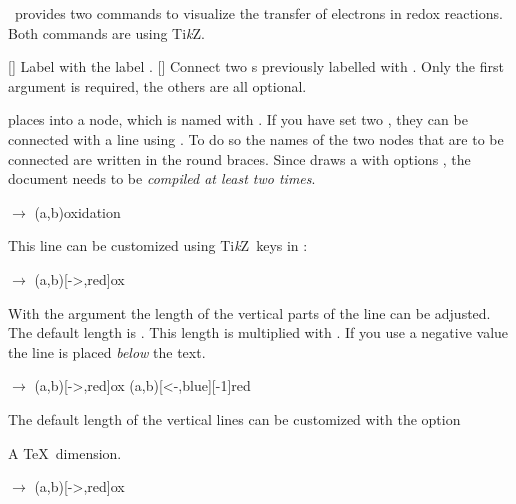 \documentclass[load-preamble+]{cnltx-doc}
\newcommand*\TikZ{Ti\textit{k}Z}
\begin{document}
\chemmacros\ provides two commands to visualize the transfer of electrons in
redox reactions.  Both commands are using \TikZ.
\begin{commands}
  []
    Label  with the label .
  []
    Connect two s previously labelled with .  Only the first
    argument  is required, the others are all
    optional.
\end{commands}

 places  into a node, which is named with .  If
you have set two , they can be connected with a line using .
To do so the names of the two nodes that are to be connected are written in
the round braces.  Since  draws a  with options
, the document needs to be \emph{compiled at
  least two times}.

\begin{example}
  \vspace{7mm}
   $\rightarrow$ \pch\redox(a,b){oxidation}
\end{example}

This line can be customized using \TikZ\ keys in :
\begin{example}
  \vspace{7mm}
   $\rightarrow$ \pch\redox(a,b)[->,red]{ox}
\end{example}

With the argument  the length of the vertical parts of the line can
be adjusted.  The default length is \code{.6em}.  This length is multiplied
with .  If you use a negative value the line is placed \emph{below}
the text.
\begin{example}
  \vspace{7mm}
   $\rightarrow$ \pch
  \redox(a,b)[->,red]{ox}
  \redox(a,b)[<-,blue][-1]{red}
  \vspace{7mm}
\end{example}

The default length of the vertical lines can be customized with the option
\begin{options}
  \Default{.6em}
    A \TeX\ dimension.
\end{options}

\begin{example}
  \vspace{7mm}
   $\rightarrow$ \pch\redox(a,b)[->,red]{ox}
\end{example}
\end{document}
